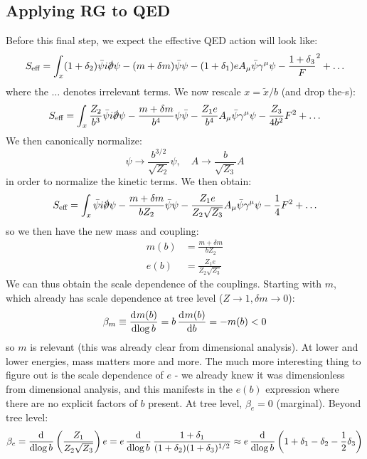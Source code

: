\subsection{Applying RG to QED}
Before this final step, we expect the effective QED action will look like:
\begin{equation}
    S_{\text{eff}} = \int_x (1 + \delta_2)\bar{\psi}i\slashed{\p}\psi - (m + \delta m)\bar{\psi}\psi - (1 + \delta_1)eA_\mu \bar{\psi}\gamma^\mu \psi - \frac{1 + \delta_3}F^2 + \ldots
\end{equation}
where the $\ldots$ denotes irrelevant terms. We now rescale $x = \tilde{x}/b$ (and drop the $\tilde{}$s):
\begin{equation}
    S_{\text{eff}} = \int_x \frac{Z_2}{b^3}\bar{\psi}i\slashed{\p}\psi - \frac{m + \delta m}{b^4}\psi\bar{\psi} - \frac{Z_1e}{b^4}A_\mu \bar{\psi}\gamma^\mu \psi -\frac{Z_3}{4b^2}F^2 + \ldots
\end{equation}
We then canonically normalize:
\begin{equation}
    \psi \to \frac{b^{3/2}}{\sqrt{Z_2}}\psi, \quad A \to \frac{b}{\sqrt{Z_3}}A
\end{equation}
in order to normalize the kinetic terms. We then obtain:
\begin{equation}
    S_{\text{eff}} = \int_x \bar{\psi} i\slashed{\p}\psi  - \frac{m + \delta m}{bZ_2}\bar{\psi}\psi - \frac{Z_1 e}{Z_2\sqrt{Z_3}}A_\mu \bar{\psi}\gamma^\mu \psi - \frac{1}{4}F^2 + \ldots
\end{equation}
so we then have the new mass and coupling:
\begin{equation}
    \begin{split}
        m(b) &= \frac{m + \delta m}{bZ_2}
        \\ e(b) &= \frac{Z_1e}{Z_2\sqrt{Z_3}}
    \end{split}
\end{equation}
We can thus obtain the scale dependence of the couplings. Starting with $m$, which already has scale dependence at tree level ($Z \to 1, \delta m \to 0$):
\begin{equation}
    \beta_m \equiv \dod{m(b)}{\log b} = b\dod{m(b)}{b} = -m(b) < 0
\end{equation}
so $m$ is relevant (this was already clear from dimensional analysis). At lower and lower energies, mass matters more and more. The much more interesting thing to figure out is the scale dependence of $e$ - we already knew it was dimensionless from dimensional analysis, and this manifests in the $e(b)$ expression where there are no explicit factors of $b$ present. At tree level, $\beta_e = 0$ (marginal). Beyond tree level:
\begin{equation}
    \beta_e = \dod{}{\log b}\left(\frac{Z_1}{Z_2\sqrt{Z_3}}\right)e = e\dod{}{\log b}\frac{1 + \delta_1}{(1 + \delta_2)(1 + \delta_3)^{1/2}} \approx e\dod{}{\log b}\left(1 + \delta_1 - \delta_2 - \frac{1}{2}\delta_3\right)
\end{equation}

